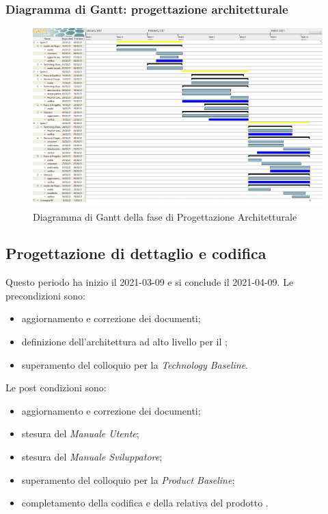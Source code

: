\subsubsection{Diagramma di Gantt: progettazione architetturale}
\begin{figure}[H]
    \centering
    \includegraphics[scale = 0.8]{components/img/progettazione_architetturale.png}
    \caption{Diagramma di Gantt della fase di Progettazione Architetturale}
    \label{fig:Diagramma di Gantt, fase di Progettazione Architetturale}
\end{figure}

\newpage
\subsection{Progettazione di dettaglio e codifica}
Questo periodo ha inizio il 2021-03-09 e si conclude il 2021-04-09.
Le precondizioni sono:
\begin{itemize}
	\item aggiornamento e correzione dei documenti;
	\item definizione dell'architettura ad alto livello per il ;
	\item  superamento del colloquio per la \textit{Technology Baseline}.
\end{itemize}
Le post condizioni sono:
\begin{itemize}
	\item aggiornamento e correzione dei documenti;
	\item stesura del \textit{Manuale Utente};
	\item stesura del \textit{Manuale Sviluppatore};
	\item superamento del colloquio per la \textit{Product Baseline};
	\item completamento della codifica e della relativa  del prodotto .
\end{itemize}
